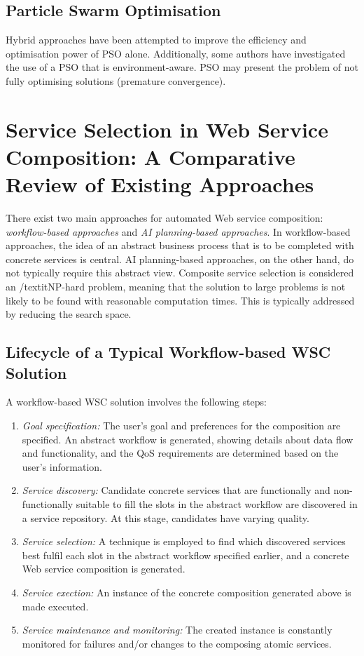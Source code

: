 \subsection{Particle Swarm Optimisation}
Hybrid approaches have been attempted to improve the efficiency and optimisation power of PSO alone. Additionally, some 
authors have investigated the use of a PSO that is environment-aware. PSO may present the problem of not fully optimising
solutions (premature convergence).

\section{Service Selection in Web Service Composition: A Comparative Review of Existing Approaches \cite{moghaddam2014service}}
There exist two main approaches for automated Web service composition: \textit{workflow-based approaches}
and \textit{AI planning-based approaches}. In workflow-based approaches, the idea of an abstract business process that is to be
completed with concrete services is central. AI planning-based approaches, on the other hand, do not typically require this
abstract view. Composite service selection is considered an /textit{NP-hard problem}, meaning that the solution to large problems
is not likely to be found with reasonable computation times. This is typically addressed by reducing the search space.

\subsection{Lifecycle of a Typical Workflow-based WSC Solution}
A workflow-based WSC solution involves the following steps:

\begin{enumerate}
 \item \textit{Goal specification:} The user's goal and preferences for the composition are specified. An abstract workflow is generated,
 showing details about data flow and functionality, and the QoS requirements are determined based on the user's information.
 \item \textit{Service discovery:} Candidate concrete services that are functionally and non-functionally suitable to fill the slots
 in the abstract workflow are discovered in a service repository. At this stage, candidates have varying quality.
 \item \textit{Service selection:} A technique is employed to find which discovered services best fulfil each slot in the abstract
 workflow specified earlier, and a concrete Web service composition is generated.
 \item \textit{Service exection:} An instance of the concrete composition generated above is made executed.
 \item \textit{Service maintenance and monitoring:} The created instance is constantly monitored for failures and/or changes
 to the composing atomic services.
\end{enumerate}

